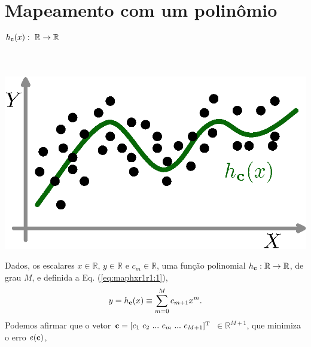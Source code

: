 \section{ Mapeamento com um polinômio
$h_{\VECTOR{c}}(x):~\mathbb{R} \rightarrow \mathbb{R}$}


\begin{theorem}
\label{theo:maphxr1r1}
~\\
\begin{minipage}{0.4\textwidth}
\centering
\includegraphics[width=0.95\linewidth]{chapters/mapeamento/mapeamento-hx.eps} 
\end{minipage}
\begin{minipage}{0.6\textwidth}
Dados,
os escalares $x \in \mathbb{R}$, $y \in \mathbb{R}$ e $c_m \in \mathbb{R}$,
uma função polinomial $h_{\VECTOR{c}}:\mathbb{R} \rightarrow \mathbb{R}$, de grau $M$, e 
definida a Eq. (\ref{eq:maphxr1r1:1}),
\begin{equation}\label{eq:maphxr1r1:1}
y=h_{\VECTOR{c}}(x)\equiv \sum_{m=0}^{M}c_{m+1} x^m.
\end{equation}
Podemos afirmar que o vetor $\VECTOR{c}=[c_1~ c_2~ ...~ c_m~ ...~ c_{M+1}]^{\transpose}$ $\in \mathbb{R}^{M+1}$,
que minimiza o erro $e(\VECTOR{c})$,
\end{minipage}


\end{theorem}
